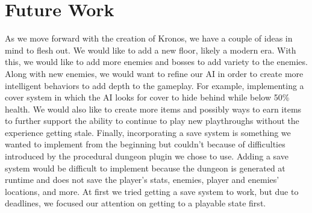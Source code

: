\documentclass{sigchi}
\begin{document}
\section{Future Work}
As we move forward with the creation of Kronos, we have a couple of ideas in mind to flesh out. We would like to add a new floor, likely a modern era. With this, we would like to add more enemies and bosses to add variety to the enemies. Along with new enemies, we would want to refine our AI in order to create more intelligent behaviors to add depth to the gameplay. For example, implementing a cover system in which the AI looks for cover to hide behind while below 50\% health. We would also like to create more items and possibly ways to earn items to further support the ability to continue to play new playthroughs without the experience getting stale. Finally, incorporating a save system is something we wanted to implement from the beginning but couldn't because of difficulties introduced by the procedural dungeon plugin we chose to use. Adding a save system would be difficult to implement because the dungeon is generated at runtime and does not save the player's stats, enemies, player and enemies' locations, and more. At first we tried getting a save system to work, but due to deadlines, we focused our attention on getting to a playable state first.
\end{document}
